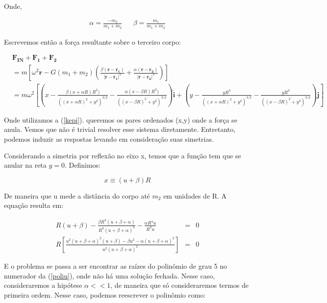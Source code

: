 Onde,

\begin{align}
\alpha = \frac{-m_2}{m_1+m_2} && \beta = \frac{m_1}{m_1+m_2}
\end{align}

Escrevemos então a força resultante sobre o terceiro corpo:


\begin{eqnarray}
& \mathbf{F_{IN}} + \mathbf{F_1} + \mathbf{F_2} \\
& = m\left[\omega^2\mathbf{r} -G(m_1+m_2)\left(\frac{\beta(\mathbf{r}-\mathbf{r_1})}{|\mathbf{r}-\mathbf{r_1}|^3} + \frac{\alpha(\mathbf{r}-\mathbf{r_2})}{|\mathbf{r}-\mathbf{r_2}|^3}\right) \right] \\
& = m\omega^2 \left[\left(x - \frac{\beta(x+\alpha R) R^3)}{((x+\alpha R)^2 + y^2)^{3/2}} - \frac{\alpha(x-\beta R) R^3)}{((x-\beta R)^2 + y^2)^{3/2}}\right)\mathbf{\hat{i}} + \left(y - \frac{y R^3}{((x+\alpha R)^2 + y^2)^{3/2}} - \frac{y R^3}{((x-\beta R)^2 + y^2)^{3/2}}\right)\mathbf{\hat{j}}\right] 
\end{eqnarray}

Onde utilizamos a (\ref{kepi}). queremos os pares ordenados (x,y) onde a força se anula. Vemos que não é trivial resolver esse sistema diretamente. Entretanto, podemos induzir as respostas levando em consideração suas simetrias.

Considerando a simetria por reflexão no eixo x, temos que a função tem que se anular na reta $y=0$. Definimos:

\begin{equation}
x \equiv (u+\beta)R
\end{equation}

De maneira que u mede a distância do corpo até $m_2$ em unidades de R. A equação resulta em:

\begin{eqnarray}
R(u+\beta) - \frac{\beta R^4(u+\beta+\alpha)}{R^3(u+\beta+\alpha)^3}- \frac{\alpha R^4u}{R^3u} & = & 0 \\
R\left[\frac{u^2(u+\beta+\alpha)^2(u+\beta)-\beta u^2 - \alpha(u+\beta+\alpha)^2}{u^2(u+\beta+\alpha)^2}\right] & = & 0 \label{poliu}
\end{eqnarray}

E o problema se passa a ser encontrar as raízes do polinômio de grau 5 no numerador da (\ref{poliu}), onde não há uma solução fechada. Nesse caso, consideraremos a hipótese $\alpha << 1$, de maneira que só consideraremos termos de primeira ordem. Nesse caso, podemos reescrever o polinômio como:


